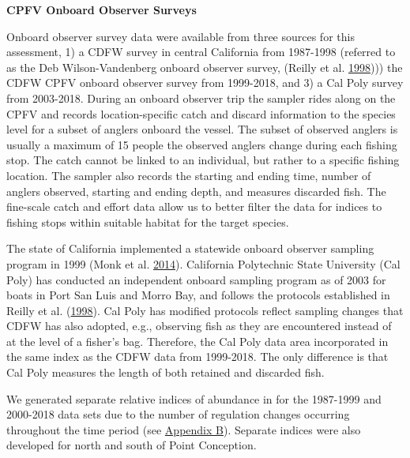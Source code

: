 \documentclass[12pt,]{article}
\begin{document}
\textbf{CPFV Onboard Observer Surveys}

Onboard observer survey data were available from three sources for this
assessment, 1) a CDFW survey in central California from 1987-1998
(referred to as the Deb Wilson-Vandenberg onboard observer survey,
(Reilly et al. \protect\hyperlink{ref-Reilly1998}{1998}))) the CDFW CPFV
onboard observer survey from 1999-2018, and 3) a Cal Poly survey from
2003-2018. During an onboard observer trip the sampler rides along on
the CPFV and records location-specific catch and discard information to
the species level for a subset of anglers onboard the vessel. The subset
of observed anglers is usually a maximum of 15 people the observed
anglers change during each fishing stop. The catch cannot be linked to
an individual, but rather to a specific fishing location. The sampler
also records the starting and ending time, number of anglers observed,
starting and ending depth, and measures discarded fish. The fine-scale
catch and effort data allow us to better filter the data for indices to
fishing stops within suitable habitat for the target species.

The state of California implemented a statewide onboard observer
sampling program in 1999 (Monk et al.
\protect\hyperlink{ref-Monk2014}{2014}). California Polytechnic State
University (Cal Poly) has conducted an independent onboard sampling
program as of 2003 for boats in Port San Luis and Morro Bay, and follows
the protocols established in Reilly et al.
(\protect\hyperlink{ref-Reilly1998}{1998}). Cal Poly has modified
protocols reflect sampling changes that CDFW has also adopted, e.g.,
observing fish as they are encountered instead of at the level of a
fisher's bag. Therefore, the Cal Poly data area incorporated in the same
index as the CDFW data from 1999-2018. The only difference is that Cal
Poly measures the length of both retained and discarded fish.

We generated separate relative indices of abundance in for the 1987-1999
and 2000-2018 data sets due to the number of regulation changes
occurring throughout the time period (see
\protect\hyperlink{appendix-b.-californias-recreational-fishery-regulations}{Appendix
B}). Separate indices were also developed for north and south of Point
Conception.
\end{document}
